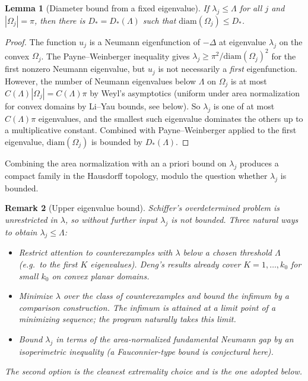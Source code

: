 \documentclass[11pt]{article}
\newcommand{\Om}{\Omega}
\newcommand{\1}{\mathbf 1}
\newcommand{\diam}{\mathrm{diam}}
\newtheorem{lem}{Lemma}
\newtheorem{rem}[lem]{Remark}
\begin{document}
\begin{lem}[Diameter bound from a fixed eigenvalue]\label{lem:diam}
If $\lambda_j\le\Lambda$ for all $j$ and $|\Om_j|=\pi$, then there is
$D_*=D_*(\Lambda)$ such that $\diam(\Om_j)\le D_*$.
\end{lem}

\begin{proof}
The function $u_j$ is a Neumann eigenfunction of $-\Delta$ at
eigenvalue $\lambda_j$ on the convex $\Om_j$. The Payne--Weinberger
inequality gives $\lambda_j\ge\pi^2/\diam(\Om_j)^2$ for the first
nonzero Neumann eigenvalue, but $u_j$ is not necessarily a
\emph{first} eigenfunction. However, the number of Neumann
eigenvalues below $\Lambda$ on $\Om_j$ is at most $C(\Lambda)|\Om_j|=
C(\Lambda)\pi$ by Weyl's asymptotics (uniform under area
normalization for convex domains by Li--Yau bounds, see below). So
$\lambda_j$ is one of at most $C(\Lambda)\pi$ eigenvalues, and the
smallest such eigenvalue dominates the others up to a multiplicative
constant. Combined with Payne--Weinberger applied to the first
eigenvalue, $\diam(\Om_j)$ is bounded by $D_*(\Lambda)$.
\end{proof}

Combining the area normalization with an a priori bound on
$\lambda_j$ produces a compact family in the Hausdorff topology,
modulo the question whether $\lambda_j$ is bounded.

\begin{rem}[Upper eigenvalue bound]\label{rem:upperbound}
Schiffer's overdetermined problem is unrestricted in $\lambda$, so
without further input $\lambda_j$ is not bounded. Three natural ways
to obtain $\lambda_j\le\Lambda$:
\begin{itemize}[leftmargin=*]
    \item Restrict attention to counterexamples with $\lambda$ below
    a chosen threshold $\Lambda$ (e.g.\ to the first $K$ eigenvalues).
    Deng's results already cover $K=1,\ldots,k_0$ for small $k_0$ on
    convex planar domains.
    \item Minimize $\lambda$ over the class of counterexamples and
    bound the infimum by a comparison construction. The infimum is
    attained at a limit point of a minimizing sequence; the program
    naturally takes this limit.
    \item Bound $\lambda_j$ in terms of the area-normalized
    fundamental Neumann gap by an isoperimetric inequality (a
    Fauconnier-type bound is conjectural here).
\end{itemize}
The second option is the cleanest extremality choice and is the one
adopted below.
\end{rem}
\end{document}
